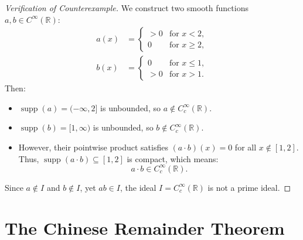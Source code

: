 \begin{content}
\begin{center}
\end{center}

\begin{proof}[Verification of Counterexample]
We construct two smooth functions $a, b \in C^\infty(\mathbb{R})$:
\begin{align*}
a(x) &= \begin{cases} > 0 & \text{for } x < 2, \\ 0 & \text{for } x \ge 2, \end{cases} \\
b(x) &= \begin{cases} 0 & \text{for } x \le 1, \\ > 0 & \text{for } x > 1. \end{cases}
\end{align*}
Then:
\begin{itemize}
    \item $\operatorname{supp}(a) = (-\infty, 2]$ is unbounded, so $a \notin C_c^\infty(\mathbb{R})$.
    \item $\operatorname{supp}(b) = [1, \infty)$ is unbounded, so $b \notin C_c^\infty(\mathbb{R})$.
    \item However, their pointwise product satisfies $(a \cdot b)(x) = 0$ for all $x \notin [1, 2]$. Thus, $\operatorname{supp}(a \cdot b) \subseteq [1, 2]$ is compact, which means:
    \[
    a \cdot b \in C_c^\infty(\mathbb{R}).
    \]
\end{itemize}
Since $a \notin I$ and $b \notin I$, yet $a b \in I$, the ideal $I = C_c^\infty(\mathbb{R})$ is not a prime ideal.
\end{proof}
\end{content}

\section{The Chinese Remainder Theorem}

